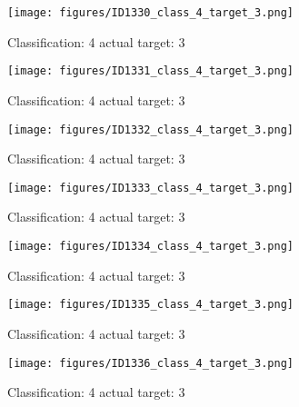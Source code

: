\begin{figure}[h!]
\begin{center}
\texttt{[image: figures/ID1330\_class\_4\_target\_3.png]}
\end{center}
\caption{ Classification: 4 actual target: 3}
\label{fig:ID1330_class_4_target_3}
\end{figure}
\begin{figure}[h!]
\begin{center}
\texttt{[image: figures/ID1331\_class\_4\_target\_3.png]}
\end{center}
\caption{ Classification: 4 actual target: 3}
\label{fig:ID1331_class_4_target_3}
\end{figure}
\begin{figure}[h!]
\begin{center}
\texttt{[image: figures/ID1332\_class\_4\_target\_3.png]}
\end{center}
\caption{ Classification: 4 actual target: 3}
\label{fig:ID1332_class_4_target_3}
\end{figure}
\begin{figure}[h!]
\begin{center}
\texttt{[image: figures/ID1333\_class\_4\_target\_3.png]}
\end{center}
\caption{ Classification: 4 actual target: 3}
\label{fig:ID1333_class_4_target_3}
\end{figure}
\begin{figure}[h!]
\begin{center}
\texttt{[image: figures/ID1334\_class\_4\_target\_3.png]}
\end{center}
\caption{ Classification: 4 actual target: 3}
\label{fig:ID1334_class_4_target_3}
\end{figure}
\begin{figure}[h!]
\begin{center}
\texttt{[image: figures/ID1335\_class\_4\_target\_3.png]}
\end{center}
\caption{ Classification: 4 actual target: 3}
\label{fig:ID1335_class_4_target_3}
\end{figure}
\begin{figure}[h!]
\begin{center}
\texttt{[image: figures/ID1336\_class\_4\_target\_3.png]}
\end{center}
\caption{ Classification: 4 actual target: 3}
\label{fig:ID1336_class_4_target_3}
\end{figure}
